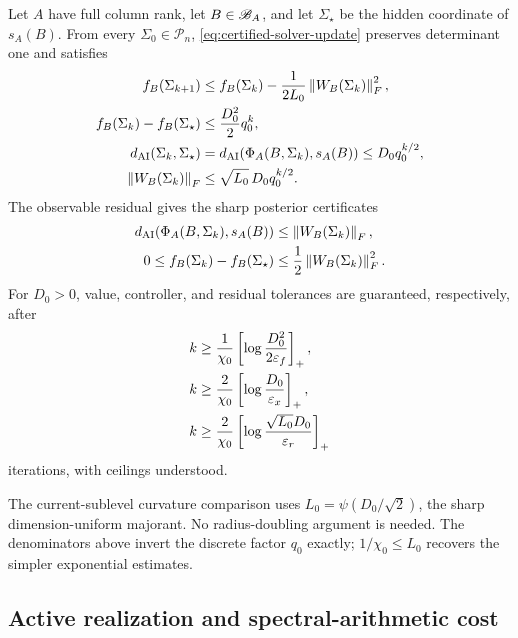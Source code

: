 \begin{theorem}
\label{thm:certified-action-solver}
Let \(A\) have full column rank, let \(B\in\mathscr B_A\), and let
\(\Sigma_\star\) be the hidden coordinate of \(s_A(B)\).  From every
\(\Sigma_0\in\mathscr P_n\), \eqref{eq:certified-solver-update} preserves
determinant one and satisfies
\begin{align}
  f_B(\Sigma_{k+1})
  &\le f_B(\Sigma_k)
  -\frac{1}{2L_0}\left\lVert W_B(\Sigma_k)\right\rVert_F^2,
  \label{eq:solver-descent}\\
  f_B(\Sigma_k)-f_B(\Sigma_\star)
  &\le \frac{D_0^2}{2}q_0^k,
  \label{eq:solver-value-rate}\\
  d_{\mathrm{AI}}(\Sigma_k,\Sigma_\star)
  &=d_{\mathrm{AI}}(\Phi_A(B,\Sigma_k),s_A(B))
  \le D_0q_0^{k/2},
  \label{eq:solver-distance-rate}\\
  \left\lVert W_B(\Sigma_k)\right\rVert_F
  &\le \sqrt{L_0}\,D_0q_0^{k/2}.
  \label{eq:solver-residual-rate}
\end{align}
The observable residual gives the sharp posterior certificates
\begin{align}
  d_{\mathrm{AI}}(\Phi_A(B,\Sigma_k),s_A(B))
  &\le\left\lVert W_B(\Sigma_k)\right\rVert_F,
  \label{eq:solver-distance-certificate}\\
  0\le f_B(\Sigma_k)-f_B(\Sigma_\star)
  &\le\frac12\left\lVert W_B(\Sigma_k)\right\rVert_F^2.
  \label{eq:solver-gap-certificate}
\end{align}
For \(D_0>0\), value, controller, and residual tolerances are guaranteed,
respectively, after
\begin{align}
  k&\ge\frac1{\chi_0}
       \left[\log\frac{D_0^2}{2\varepsilon_f}\right]_+,
  \label{eq:solver-value-complexity}\\
  k&\ge\frac2{\chi_0}
       \left[\log\frac{D_0}{\varepsilon_x}\right]_+,
  \label{eq:solver-distance-complexity}\\
  k&\ge\frac2{\chi_0}
       \left[\log\frac{\sqrt{L_0}D_0}{\varepsilon_r}\right]_+
  \label{eq:solver-residual-complexity}
\end{align}
iterations, with ceilings understood.
\end{theorem}

The current-sublevel curvature comparison uses
\(L_0=\psi(D_0/\sqrt2)\), the sharp dimension-uniform majorant.  No
radius-doubling argument is needed.  The denominators above invert the
discrete factor \(q_0\) exactly; \(1/\chi_0\le L_0\) recovers the simpler
exponential estimates.

\subsection{Active realization and spectral-arithmetic cost}

